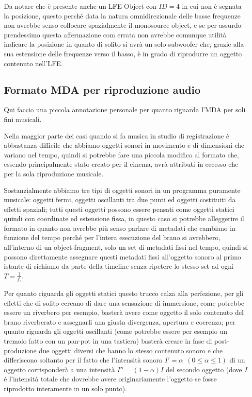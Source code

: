 \documentclass[12pt,a4paper]{report}
\begin{document}
Da notare che è presente anche un LFE-Object con $ID=4$ in cui non è segnata la posizione, questo perché data la natura omnidirezionale delle basse frequenze non avrebbe senso collocare spazialmente il monosource-object, e se per assurdo prendessimo questa affermazione com errata non avrebbe comunque utilità indicare la posizione in quanto di solito si avrà un solo subwoofer che, grazie alla sua estensione delle frequenze verso il basso, è in grado di riprodurre un oggetto contenuto nell'LFE.


\subsection{Formato MDA per riproduzione audio}

Qui faccio una piccola annotazione personale per quanto riguarda l'MDA per soli fini musicali.

Nella maggior parte dei casi quando si fa musica in studio di registrazione è abbastanza difficile che abbiamo oggetti sonori in movimento e di dimensioni che variano nel tempo, quindi si potrebbe fare una piccola modifica al formato che, essendo principalmente stato creato per il cinema, avrà attributi in eccesso che per la sola riproduzione musicale.

Sostanzialmente abbiamo tre tipi di oggetti sonori in un programma puramente musicale: oggetti fermi, oggetti oscillanti tra due punti ed oggetti costituiti da effetti spaziali; tutti questi oggetti possono essere pensati come oggetti statici quindi con coordinate ed estensione fissa, in questo caso si potrebbe alleggerire il formato in quanto non avrebbe più senso parlare di metadati che cambiano in funzione del tempo perché per l'intera esecuzione del brano si avrebbero, all'interno di un object-fragment, solo un set di metadati fissi nel tempo, quindi si possono direttamente assegnare questi metadati fissi all'oggetto sonoro al primo istante di richiamo da parte della  timeline senza ripetere lo stesso set ad ogni $T=\frac{1}{f_c}$.

Per quanto riguarda gli oggetti statici questo trucco calza alla perfezione, per gli effetti che di solito cercano di dare una sensazione di immersione, come potrebbe essere un riverbero per esempio, basterà avere come oggetto il solo contenuto del brano riverberato e assegnarli una giusta divergenza, apertura e coerenza; per quanto riguarda gli oggetti oscillanti (come potrebbe essere per esempio un tremolo fatto con un pan-pot in una tastiera) basterà creare in fase di post-produzione due oggetti diversi che hanno lo stesso contenuto sonoro e che differiscono soltanto per il fatto che l'intensità sonora $I'=\alpha \ \ (0\leq \alpha \leq 1)$ di un oggetto corrisponderà a una intensità $I''=(1-\alpha) I$ del secondo oggetto (dove $I$ é l'intensità totale che dovrebbe avere originariamente l'oggetto se fosse riprodotto interamente in un solo punto).
\end{document}
